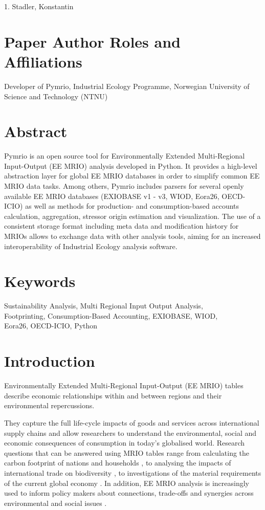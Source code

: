 \documentclass{jors}
\begin{document}
{1. Stadler, Konstantin

\section*{Paper Author Roles and Affiliations}
Developer of Pymrio, Industrial Ecology Programme, Norwegian University of Science and Technology (NTNU)

\section*{Abstract}

Pymrio is an open source tool for Environmentally Extended Multi-Regional Input-Output (EE MRIO) analysis developed in Python.
It provides a high-level abstraction layer for global EE MRIO databases in order to simplify common EE MRIO data tasks. 
Among others, Pymrio includes parsers for several openly available EE MRIO databases (EXIOBASE v1 - v3, WIOD, Eora26, OECD-ICIO) as well as methods for production- and consumption-based accounts calculation, aggregation, stressor origin estimation and visualization. 
The use of a consistent storage format including meta data and modification history for MRIOs allows to exchange data with other analysis tools, aiming for an increased interoperability of Industrial Ecology analysis software.

\section*{Keywords}

Sustainability Analysis, Multi Regional Input Output Analysis, \\ Footprinting, Consumption-Based Accounting, EXIOBASE, WIOD, \\ Eora26, OECD-ICIO, Python

\section*{Introduction}

Environmentally Extended Multi-Regional Input-Output (EE MRIO) tables describe economic relationships within and between regions and their environmental repercussions.

They capture the full life-cycle impacts of goods and services across international supply chains and allow researchers to understand the environmental, social and economic consequences of consumption in today's globalised world. 
Research questions that can be answered using MRIO tables range from calculating the carbon footprint of nations \cite{tukker2014_Global, kanemoto2016_Mapping} and households \cite{ivanova2016_Environmental}, to analysing the impacts of international trade on biodiversity \cite{lenzen2012_International, verones2017_Resource, marques2019_Increasing}, to investigations of the material requirements of the current global economy \cite{wiedmann2013_material}. In addition, EE MRIO analysis is increasingly used to inform policy makers about connections, trade-offs and synergies across environmental and social issues \cite{simas2014_Bad, simas2017_Correlation, vivanco2018_Nexus, wood2020_peak}.

}
\end{document}
